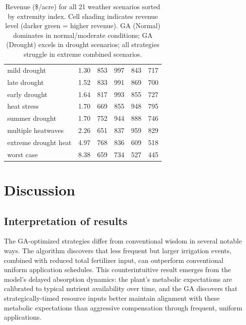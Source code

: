 \documentclass[preprint,12pt]{elsarticle}
\begin{document}
\begin{table}[ht]
\begin{tabular}{|l|c|c|c|c|c|}
mild drought         & 1.30 & \cellcolor{c5}853 & \cellcolor{c7}997 & \cellcolor{c5}843 & \cellcolor{c4}717 \\
late drought         & 1.52 & \cellcolor{c5}833 & \cellcolor{c6}991 & \cellcolor{c5}869 & \cellcolor{c4}700 \\
early drought        & 1.64 & \cellcolor{c5}817 & \cellcolor{c6}993 & \cellcolor{c5}855 & \cellcolor{c4}727 \\
heat stress          & 1.70 & \cellcolor{c3}669 & \cellcolor{c5}855 & \cellcolor{c6}948 & \cellcolor{c4}795 \\
summer drought       & 1.70 & \cellcolor{c4}752 & \cellcolor{c6}944 & \cellcolor{c5}888 & \cellcolor{c4}746 \\
multiple heatwaves   & 2.26 & \cellcolor{c3}651 & \cellcolor{c5}837 & \cellcolor{c6}959 & \cellcolor{c5}829 \\
extreme drought heat & 4.97 & \cellcolor{c4}768 & \cellcolor{c5}836 & \cellcolor{c3}609 & \cellcolor{c2}518 \\
worst case           & 8.38 & \cellcolor{c3}659 & \cellcolor{c4}734 & \cellcolor{c2}527 & \cellcolor{c1}445 \\
\hline
\end{tabular}
\caption{Revenue (\$/acre) for all 21 weather scenarios sorted by extremity index. Cell shading indicates revenue level (darker green = higher revenue). GA (Normal) dominates in normal/moderate conditions; GA (Drought) excels in drought scenarios; all strategies struggle in extreme combined scenarios.}
\label{tab:scenario-results}
\end{table}

\section{Discussion}\label{sec:discussion}

\subsection{Interpretation of results}\label{subsec:interpretation}

The GA-optimized strategies differ from conventional wisdom in several notable ways. The algorithm discovers that less frequent but larger irrigation events, combined with reduced total fertilizer input, can outperform conventional uniform application schedules. This counterintuitive result emerges from the model's delayed absorption dynamics: the plant's metabolic expectations are calibrated to typical nutrient availability over time, and the GA discovers that strategically-timed resource inputs better maintain alignment with these metabolic expectations than aggressive compensation through frequent, uniform applications.
\end{document}
